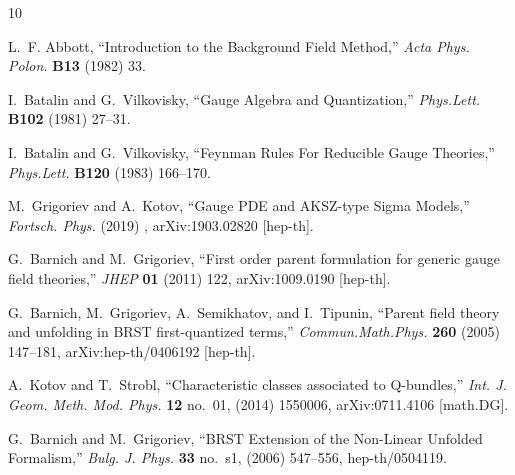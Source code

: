 \documentclass[a4paper,12pt]{article}
\numberwithin{equation}{section} %
\begin{document}
%
\setlength{\itemsep}{0em}
\small
%
\providecommand{\href}[2]{#2}\begingroup\raggedright\begin{thebibliography}{10}

L.~F. Abbott, ``{Introduction to the Background Field Method},''
{\em Acta Phys. Polon.} {\bfseries B13} (1982) 33.

I.~Batalin and G.~Vilkovisky, ``{G}auge {A}lgebra and {Q}uantization,''
\href{http://dx.doi.org/10.1016/0370-2693(81)90205-7}{{\em Phys.Lett.} {\bfseries B102} (1981) 27--31}.

I.~Batalin and G.~Vilkovisky, ``{F}eynman {R}ules {F}or {R}educible {G}auge {T}heories,''
\href{http://dx.doi.org/10.1016/0370-2693(83)90645-7}{{\em Phys.Lett.} {\bfseries B120} (1983) 166--170}.

M.~Grigoriev and A.~Kotov, ``{Gauge PDE and AKSZ-type Sigma Models},'' \href{http://dx.doi.org/10.1002/1521-3978(200209)50:8/9<825::AID-PROP825>3.0.CO;2-V}{{\em Fortsch. Phys.} (2019) }, \href{http://arxiv.org/abs/1903.02820}{{\ttfamily arXiv:1903.02820 [hep-th]}}.

G.~Barnich and M.~Grigoriev, ``{F}irst order parent formulation for generic gauge field theories,'' \href{http://dx.doi.org/10.1007/JHEP01(2011)122}{{\em JHEP} {\bfseries 01} (2011) 122},
\href{http://arxiv.org/abs/1009.0190}{{\ttfamily arXiv:1009.0190 [hep-th]}}.

G.~Barnich, M.~Grigoriev, A.~Semikhatov, and I.~Tipunin, ``{P}arent field theory and unfolding in {BRST} first-quantized terms,'' \href{http://dx.doi.org/10.1007/s00220-005-1408-4}{{\em Commun.Math.Phys.} {\bfseries 260} (2005) 147--181},
\href{http://arxiv.org/abs/hep-th/0406192}{{\ttfamily arXiv:hep-th/0406192 [hep-th]}}.

A.~Kotov and T.~Strobl, ``{Characteristic classes associated to Q-bundles},'' \href{http://dx.doi.org/10.1142/S0219887815500061}{{\em Int. J. Geom. Meth. Mod. Phys.} {\bfseries 12} no.~01, (2014) 1550006},
\href{http://arxiv.org/abs/0711.4106}{{\ttfamily arXiv:0711.4106 [math.DG]}}.

G.~Barnich and M.~Grigoriev, ``{BRST Extension of the Non-Linear Unfolded Formalism},'' {\em Bulg. J. Phys.} {\bfseries 33} no.~s1, (2006) 547--556, \href{http://arxiv.org/abs/hep-th/0504119}{{\ttfamily hep-th/0504119}}.


\end{thebibliography}
\end{document}
